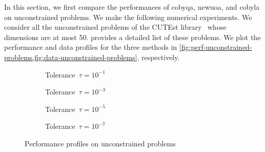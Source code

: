 In this section, we first compare the performances of \gls{cobyqa}, \gls{newuoa}, and \gls{cobyla} on unconstrained problems.
We make the following numerical experiments.
We consider all the unconstrained problems of the CUTEst library~\cite{Gould_Orban_Toint_2015} whose dimensions are at most \num{50}.
 provides a detailed list of these problems.
We plot the performance and data profiles for the three methods in \cref{fig:perf-unconstrained-problems,fig:data-unconstrained-problems}, respectively.

\begin{figure}[ht]
    \centering
    \begin{subfigure}[b]{0.49\textwidth}
        \centering
        \caption{Tolerance~$\tau = 10^{-1}$}
    \end{subfigure}
    \hfill
    \begin{subfigure}[b]{0.49\textwidth}
        \centering
        \caption{Tolerance~$\tau = 10^{-3}$}
    \end{subfigure}
    \begin{subfigure}[b]{0.49\textwidth}
        \centering
        \caption{Tolerance~$\tau = 10^{-5}$}
    \end{subfigure}
    \hfill
    \begin{subfigure}[b]{0.49\textwidth}
        \centering
        \caption{Tolerance~$\tau = 10^{-7}$}
    \end{subfigure}
    \caption{Performance profiles on unconstrained problems}
    \label{fig:perf-unconstrained-problems}
\end{figure}

